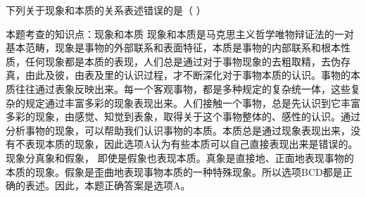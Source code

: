 \question 下列关于现象和本质的关系表述错误的是（ ）
\par{}
\begin{solution}本题考查的知识点：现象和本质
现象和本质是马克思主义哲学唯物辩证法的一对基本范畴，现象是事物的外部联系和表面特征，本质是事物的内部联系和根本性质，任何现象都是本质的表现，人们总是通过对于事物现象的去粗取精，去伪存真，由此及彼，由表及里的认识过程，才不断深化对于事物本质的认识。事物的本质往往通过表象反映出来。每一个客观事物，都是多种规定的复杂统一体，这些复杂的规定通过丰富多彩的现象表现出来。人们接触一个事物，总是先认识到它丰富多彩的现象，由感觉、知觉到表象，取得关于这个事物整体的、感性的认识。通过分析事物的现象，可以帮助我们认识事物的本质。本质总是通过现象表现出来，没有不表现本质的现象，因此选项A认为有些本质可以自己直接表现出来是错误的。现象分真象和假象，
即使是假象也表现本质。真象是直接地、正面地表现事物的本质的现象。假象是歪曲地表现事物本质的一种特殊现象。所以选项BCD都是正确的表述。因此，本题正确答案是选项A。
\end{solution}
